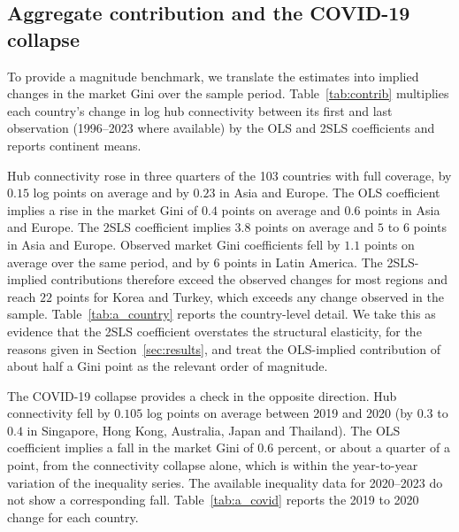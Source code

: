 \subsection{Aggregate contribution and the COVID-19 collapse}
\label{sec:contrib}
To provide a magnitude benchmark, we translate the estimates into implied changes in the market Gini over the sample period. Table~\ref{tab:contrib} multiplies each country's change in log hub connectivity between its first and last observation (1996--2023 where available) by the OLS and 2SLS coefficients and reports continent means.

Hub connectivity rose in three quarters of the 103 countries with full coverage, by $0.15$ log points on average and by $0.23$ in Asia and Europe. The OLS coefficient implies a rise in the market Gini of $0.4$ points on average and $0.6$ points in Asia and Europe. The 2SLS coefficient implies $3.8$ points on average and $5$ to $6$ points in Asia and Europe. Observed market Gini coefficients fell by $1.1$ points on average over the same period, and by $6$ points in Latin America. The 2SLS-implied contributions therefore exceed the observed changes for most regions and reach $22$ points for Korea and Turkey, which exceeds any change observed in the sample. Table~\ref{tab:a_country} reports the country-level detail. We take this as evidence that the 2SLS coefficient overstates the structural elasticity, for the reasons given in Section~\ref{sec:results}, and treat the OLS-implied contribution of about half a Gini point as the relevant order of magnitude.

The COVID-19 collapse provides a check in the opposite direction. Hub connectivity fell by $0.105$ log points on average between 2019 and 2020 (by $0.3$ to $0.4$ in Singapore, Hong Kong, Australia, Japan and Thailand). The OLS coefficient implies a fall in the market Gini of $0.6$ percent, or about a quarter of a point, from the connectivity collapse alone, which is within the year-to-year variation of the inequality series. The available inequality data for 2020--2023 do not show a corresponding fall. Table~\ref{tab:a_covid} reports the 2019 to 2020 change for each country.


